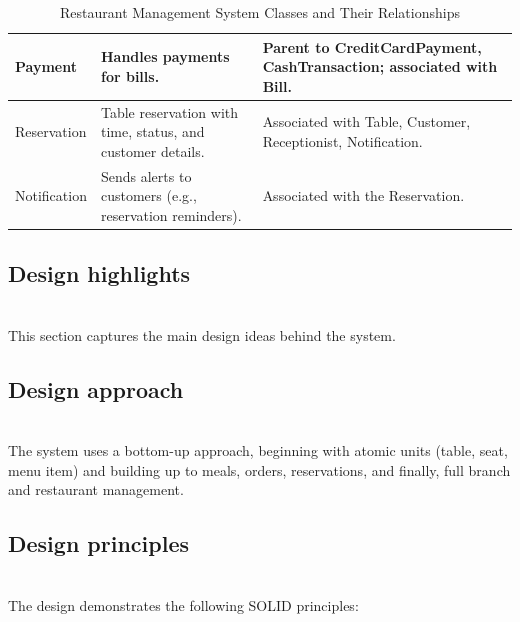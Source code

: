 \begin{table}[h!]
\begin{tabularx}{\textwidth}{|X|X|X|}
\hline
Payment & Handles payments for bills. & Parent to CreditCardPayment, CashTransaction; associated with Bill. \\
\hline
Reservation & Table reservation with time, status, and customer details. & Associated with Table, Customer, Receptionist, Notification. \\
\hline
Notification & Sends alerts to customers (e.g., reservation reminders). & Associated with the Reservation. \\
\hline
\end{tabularx}
\caption{Restaurant Management System Classes and Their Relationships}
\label{tab:restaurant_classes}
\end{table}

\subsection{Design highlights}\label{1ua1igwgRPu0VBANDDs58}
\\
This section captures the main design ideas behind the system.

\subsection{Design approach}\label{DbGHNucVFx-IgRCZxbKaC}
\\
The system uses a bottom-up approach, beginning with atomic units (table, seat, menu item) and building up to meals, orders, reservations, and finally, full branch and restaurant management.

\subsection{Design principles}\label{xob1VB7QMYimXbMw-6hIq}
\\
The design demonstrates the following SOLID principles:

